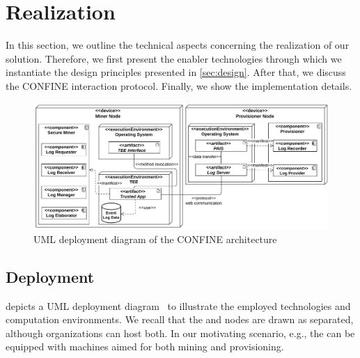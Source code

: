 \section{Realization}
\label{sec:realization}
In this section, we outline the technical aspects concerning the realization of our solution. Therefore, we first present the enabler technologies through which we instantiate the design principles presented in \cref{sec:design}. After that, we discuss the CONFINE interaction protocol. Finally, we show the implementation details.

%
\begin{figure}[t]
	\centering
	\includegraphics[width=1\linewidth]{content/figures/deploymentdiagram.pdf}
	\caption{UML deployment diagram of the CONFINE architecture}
	\label{fig:deployment_diagram}
\end{figure}
%
\subsection{Deployment}
\label{sec:deployment}
%
 depicts a UML deployment diagram~\citep{koch2002expressive} to illustrate the employed technologies and computation environments. %
We recall that the  and  nodes are drawn as separated, although organizations can host both.
In our motivating scenario, e.g., the  can be equipped with machines aimed for both mining and provisioning. %

